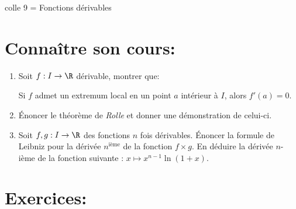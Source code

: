 \documentclass[a4paper,11pt]{article}
\theoremstyle{definition}
\begin{document}
	
	
	\begin{center}
		\Large \sc colle 9 = Fonctions dérivables
	\end{center}
\raggedright

\section*{Connaître son cours:}
\begin{enumerate}
	\item Soit $f : I \rightarrow \R$ dérivable, montrer que: 
	
	Si $f$ admet un extremum local en un point $a$ intérieur à $I$, alors $f'(a) = 0 $.
	\item Énoncer le théorème de \emph{Rolle} et donner une démonstration de celui-ci. 
	\item Soit $f , g : I \rightarrow \R$ des fonctions $n$ fois dérivables. Énoncer la formule de Leibniz pour la dérivée $n^{\text{ième}}$ de la fonction $f\times g$. En déduire la dérivée $n$-ième de la fonction suivante :
	$x\mapsto x^{n-1}\ln(1+x).$
	
\end{enumerate}

\section*{Exercices:}	
\end{document}

